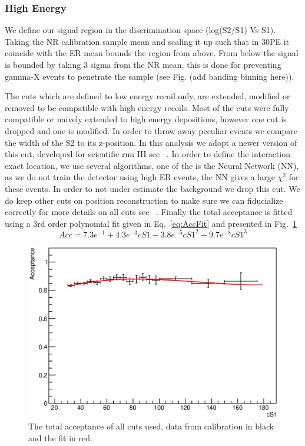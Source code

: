 \subsubsection{High Energy}
We define our signal region in the discrimination space (log(S2/S1) Vs S1). Taking the NR calibration sample mean and scaling it up such that in 30PE it coincide with the ER mean bounds the region from above. From below the signal is bounded by taking 3 sigma from the NR mean, this is done for preventing gamma-X events to penetrate the sample (see Fig. (add banding  binning here)).

The cuts which are defined to low energy recoil only, are extended, modified or removed to be compatible with high energy recoils. Most of the cuts were fully compatible or naively extended to high energy depositions, however one cut is dropped and one is modified. In order to throw away peculiar events we compare the width of the S2 to its z-position. In this analysis we adopt a newer version of this cut, developed for scientific run III see ~\cite{xe100_run_combination}. In order to define the interaction exact location, we use several algorithms, one of the is the Neural Network (NN), as we do not train the detector using high ER events, the NN gives a large $\chi^2$ for these events. In order to not under estimate the background we drop this cut. We do keep other cuts on position reconstruction to make sure we can fiducialize correctly for more details on all cuts see ~\cite{xe100_ana2012}. Finally the total acceptance is fitted using a 3rd order polynomial fit given in Eq.~\ref{eq:AccFit} and presented in Fig.~\ref{fig:Acc}
\begin{equation}
\label{eq:AccFit}
	Acc = 7.3e^{-1}+4.3e^{-3}cS1-3.8e^{-5}cS1^2+9.7e^{-8}cS1^3
\end{equation}

\begin{figure}[h!]
\begin{minipage}{1.\linewidth}
\centerline{\includegraphics[width=1.\linewidth]{Figures/Acceptance.eps}}
\end{minipage}
\caption{The total acceptance of all cuts used, data from calibration in black and the fit in red.}
\label{fig:Acc}
\end{figure}

